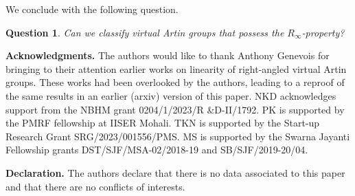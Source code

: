 \documentclass[12pt]{amsart}
\newtheorem{question}[equation]{Question}
\numberwithin{equation}{section}
\begin{document}
We conclude with the following question.

\begin{question}
Can we classify virtual Artin groups that possess the $R_\infty$-property?
\end{question}
\medskip


\noindent\textbf{Acknowledgments.}
The authors would like to thank Anthony Genevois for bringing to their attention earlier works on linearity of right-angled virtual Artin groups. These works had been overlooked by the authors, leading to a reproof of the same results in an earlier (arxiv) version of this paper. NKD acknowledges support from the NBHM grant 0204/1/2023/R \&D-II/1792.  PK is supported by the PMRF fellowship at IISER Mohali.  TKN is supported by the Start-up Research Grant SRG/2023/001556/PMS. MS is supported by the Swarna Jayanti Fellowship grants DST/SJF/MSA-02/2018-19 and SB/SJF/2019-20/04. 
\medskip

\noindent\textbf{Declaration.}
The authors declare that there is no data associated to this paper and that there are no conflicts of interests.
\medskip
\end{document}
